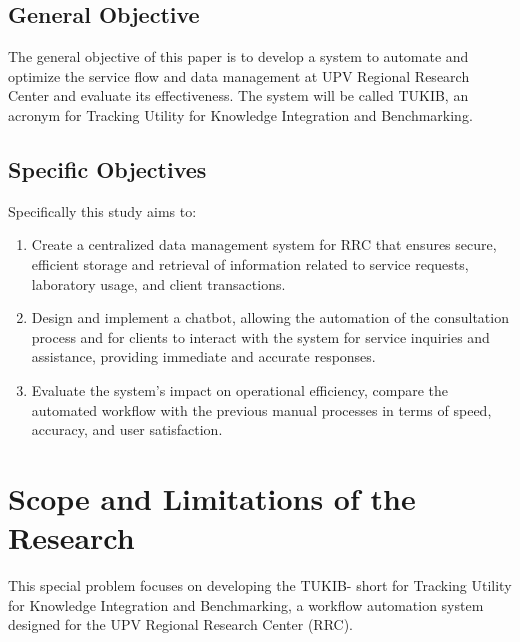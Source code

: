 \subsection{General Objective}
\label{sec:generalobjective}

The general objective of this paper is to develop a system to automate and optimize the service flow and data management at UPV Regional Research Center and evaluate its effectiveness. The system will be called TUKIB, an acronym for Tracking Utility for Knowledge Integration and Benchmarking. 

\subsection{Specific Objectives}
\label{sec:specificobjectives}

Specifically this study aims to:

\begin{enumerate}
   
   \item Create a centralized data management system for RRC that ensures secure, efficient storage and retrieval of information related to service requests, laboratory usage, and client transactions.
   
   \item Design and implement a chatbot, allowing the automation of the consultation process and for clients to interact with the system for service inquiries and assistance, providing immediate and accurate responses.
   
   \item Evaluate the system’s impact on operational efficiency, compare the automated workflow with the previous manual processes in terms of speed, accuracy, and user satisfaction.
   
\end{enumerate}


\section{Scope and Limitations of the Research}
\label{sec:scopelimitations}

This special problem focuses on developing the TUKIB- short for Tracking Utility for Knowledge Integration and Benchmarking, a workflow automation system designed for the UPV Regional Research Center (RRC). 

